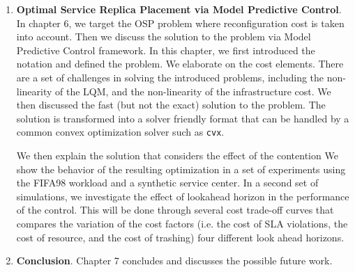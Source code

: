 \documentclass[11pt]{article}
\begin{document}
\begin{enumerate}
   \item  \textbf{Optimal Service Replica Placement via Model Predictive Control}. 
 In chapter 6, we target the OSP problem where reconfiguration cost is taken into account. Then we discuss the solution to the problem via Model Predictive Control framework.  
In this chapter, we first introduced the notation and defined the problem.
We elaborate on the cost elements. 
There are a set of challenges in solving the introduced problems, including the non-linearity of the LQM, and the non-linearity of the infrastructure cost.
We then discussed the fast (but not the exact) solution to the problem. The solution is transformed into a solver friendly format that can be handled by a common convex optimization solver such as \texttt{cvx}.

We then explain the solution that considers the effect of the contention
We show the behavior of the resulting optimization in a set of experiments using the FIFA98 workload and a synthetic service center. In a second set of simulations, we investigate the effect of lookahead horizon in the performance of the control. This will be done through several cost trade-off curves that compares the variation of the cost factors (i.e. the cost of SLA violations, the cost of resource, and the cost of trashing) four different look ahead horizons.
 
\item \textbf{Conclusion}. Chapter 7 concludes and discusses the possible future work.  

\end{enumerate}




\end{document}

